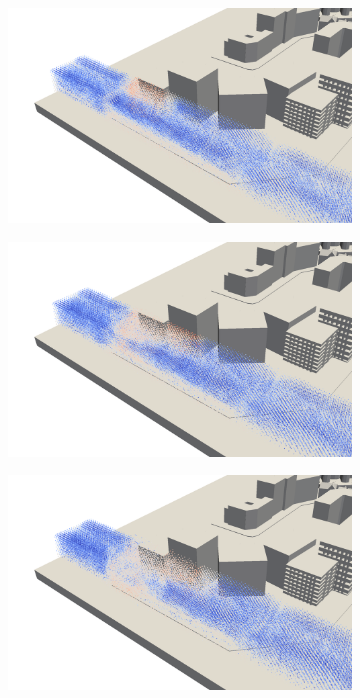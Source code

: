 \begin{figure}[h]
  \begin{subfigure}{.5\textwidth}
    \centering
    \includegraphics[width=\textwidth]{figures/visc-0.png}
  \end{subfigure}
  \begin{subfigure}{.5\textwidth}
    \centering
    \includegraphics[width=\textwidth]{figures/visc-1.png}
  \end{subfigure}
  \begin{subfigure}{.5\textwidth}
    \centering
    \includegraphics[width=\textwidth]{figures/visc-2.png}

\end{subfigure}
\end{figure}
